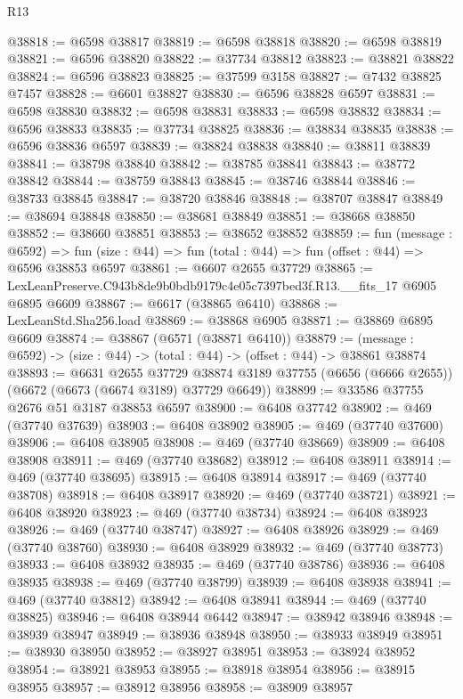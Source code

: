 \begin{lexlean}{R13}
\begin{coremodule}
@38818 := @6598 @38817
@38819 := @6598 @38818
@38820 := @6598 @38819
@38821 := @6596 @38820
@38822 := @37734 @38812
@38823 := @38821 @38822
@38824 := @6596 @38823
@38825 := @37599 @3158
@38827 := @7432 @38825 @7457
@38828 := @6601 @38827
@38830 := @6596 @38828 @6597
@38831 := @6598 @38830
@38832 := @6598 @38831
@38833 := @6598 @38832
@38834 := @6596 @38833
@38835 := @37734 @38825
@38836 := @38834 @38835
@38838 := @6596 @38836 @6597
@38839 := @38824 @38838
@38840 := @38811 @38839
@38841 := @38798 @38840
@38842 := @38785 @38841
@38843 := @38772 @38842
@38844 := @38759 @38843
@38845 := @38746 @38844
@38846 := @38733 @38845
@38847 := @38720 @38846
@38848 := @38707 @38847
@38849 := @38694 @38848
@38850 := @38681 @38849
@38851 := @38668 @38850
@38852 := @38660 @38851
@38853 := @38652 @38852
@38859 := fun (message : @6592) =>
  fun (size : @44) => fun (total : @44) => fun (offset : @44) => @6596 @38853 @6597
@38861 := @6607 @2655 @37729
@38865 := LexLeanPreserve.C943b8de9b0bdb9179c4e05c7397bed3f.R13.__fits_17 @6905 @6895 @6609
@38867 := @6617 (@38865 @6410)
@38868 := LexLeanStd.Sha256.load
@38869 := @38868 @6905
@38871 := @38869 @6895 @6609
@38874 := @38867 (@6571 (@38871 @6410))
@38879 := (message : @6592) -> (size : @44) -> (total : @44) -> (offset : @44) -> @38861 @38874
@38893 := @6631
    @2655
    @37729
    @38874
    @3189
    @37755
    (@6656 (@6666 @2655))
    (@6672 (@6673 (@6674 @3189) @37729 @6649))
@38899 := @33586 @37755 @2676 @51 @3187 @38853 @6597
@38900 := @6408 @37742
@38902 := @469 (@37740 @37639)
@38903 := @6408 @38902
@38905 := @469 (@37740 @37600)
@38906 := @6408 @38905
@38908 := @469 (@37740 @38669)
@38909 := @6408 @38908
@38911 := @469 (@37740 @38682)
@38912 := @6408 @38911
@38914 := @469 (@37740 @38695)
@38915 := @6408 @38914
@38917 := @469 (@37740 @38708)
@38918 := @6408 @38917
@38920 := @469 (@37740 @38721)
@38921 := @6408 @38920
@38923 := @469 (@37740 @38734)
@38924 := @6408 @38923
@38926 := @469 (@37740 @38747)
@38927 := @6408 @38926
@38929 := @469 (@37740 @38760)
@38930 := @6408 @38929
@38932 := @469 (@37740 @38773)
@38933 := @6408 @38932
@38935 := @469 (@37740 @38786)
@38936 := @6408 @38935
@38938 := @469 (@37740 @38799)
@38939 := @6408 @38938
@38941 := @469 (@37740 @38812)
@38942 := @6408 @38941
@38944 := @469 (@37740 @38825)
@38946 := @6408 @38944 @6442
@38947 := @38942 @38946
@38948 := @38939 @38947
@38949 := @38936 @38948
@38950 := @38933 @38949
@38951 := @38930 @38950
@38952 := @38927 @38951
@38953 := @38924 @38952
@38954 := @38921 @38953
@38955 := @38918 @38954
@38956 := @38915 @38955
@38957 := @38912 @38956
@38958 := @38909 @38957

\end{coremodule}
\end{lexlean}
